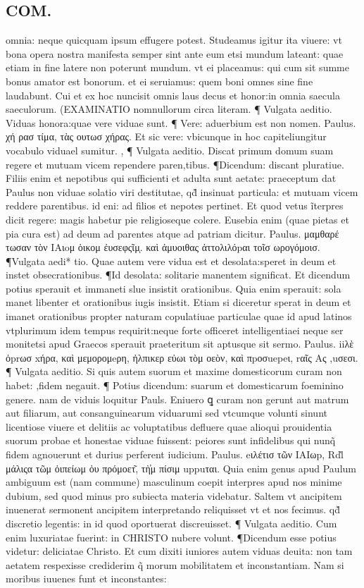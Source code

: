 \documentclass{article}
\begin{document}
\begin{pages}
\section*{COM. }
\marginpar{[ p.5 ]}\pstart omnia: neque quicquam ipsum effugere potest. Studeamus igitur ita viuere: vt bona opera nostra manifesta semper sint ante eum etsi mundum lateant: quae etiam in fine latere non poterunt mundum. vt ei placeamus: qui cum sit summe bonus amator est bonorum. et ei seruiamus: quem boni omnes sine fine laudabunt. Cui et ex hoc nuncisit omnis laus  decus et honor:in omnia saecula saeculorum.  \pend\pstart  (EXAMINATIO nomnullorum circa literam. ¶ Vulgata aeditio. Viduas honora:quae vere viduae sunt. ¶ Vere: aduerbium est non nomen. Paulus. χή ρασ τίμα, τὰς ουτωσ χήρας. Et sic vere: vbicunque in hoc capiteliungitur vocabulo viduael sumitur. , ¶ Vulgata aeditio. Discat primum domum suam regere et mutuam vicem rependere paren,tibus. ¶Dicendum: discant pluratiue. Filiis enim et nepotibus qui sufficienti et adulta sunt aetate: praeceptum dat Paulus non viduae solatio viri destitutae, qd̃ insinuat particula: et mutuam vicem reddere parentibus. id eni: ad filios et nepotes pertinet. Et quod vetus ĩterpres dicit regere: magis habetur pie religioseque colere. Eusebia enim (quae pietas et pia cura est) ad deum ad parentes atque ad patriam dicitur. Paulus. μαμθαρέ τωσαν τὸν IAιoμ ὁικομ ἐυσεφςῖμͅ. καὶ ἀμυοιθας ἀττολιλόpαι τοῖσ ωρογόμοισ. ¶Vulgata aedi* tio. Quae autem vere vidua est et desolata:speret in deum et instet obsecrationibus. ¶Id desolata: solitarie manentem significat. Et dicendum potius sperauit et immaneti slue insistit orationibus. Quia enim sperauit: sola manet libenter et orationibus iugis insistit. Etiam si diceretur sperat in deum et imanet orationibus propter naturam copulatiuae particulae quae id apud latinos vtplurimum idem tempus requirit:neque forte officeret intelligentiaei neque ser monitetsi apud Graecos sperauit praeteritum sit aptusque sit sermo. Paulus. iiλὲ ὀprωσ xήρα, καὶ μεμορομeρη, ἠλπικερ εὐωι τὸμ οεὸν, καὶ πpοσuepeι, rαῖς Aς ,uσεσι. ¶ Vulgata aeditio. Si quis autem suorum et maxime domesticorum curam non habet: ,fidem negauit. ¶ Potius dicendum: suarum et domesticarum foeminino genere. nam de viduis loquitur Pauls. Eniuero ꝗ curam non gerunt aut matrum aut filiarum, aut consanguinearum viduarumi sed vtcumque volunti sinunt licentiose viuere et delitiis ac voluptatibus defluere quae alioqui prouidentia suorum probae et honestae viduae fuissent: peiores sunt infidelibus qui nunq̃ fidem agnouerunt et durius perferent iudicium. Paulus. eιλέτισ τῶν IAIωp, Rdl̀ μάλιςα τῶμ ὀιπείωμ ὀυ πρόμοετ͂, τὴ̓μ πίσιμ uppuται. Quia enim genus apud Paulum ambiguum est (nam commune) masculinum coepit interpres apud nos minime dubium, sed quod minus pro subiecta materia videbatur. Saltem vt ancipitem inuenerat sermonent ancipitem interpretando reliquisset vt et nos fecimus. qd̃ discretio legentis: in id quod oportuerat discreuisset. ¶ Vulgata aeditio. Cum enim luxuriatae fuerint: in CHRISTO nubere volunt. ¶Dicendum esse potius videtur: deliciatae Christo. Et cum dixiti iuniores autem viduas deuita: non tam aetatem respexisse crediderim q̃ morum mobilitatem et inconstantiam. Nam si moribus iuuenes funt et inconstantes: 
\end{pages}
\end{document}
